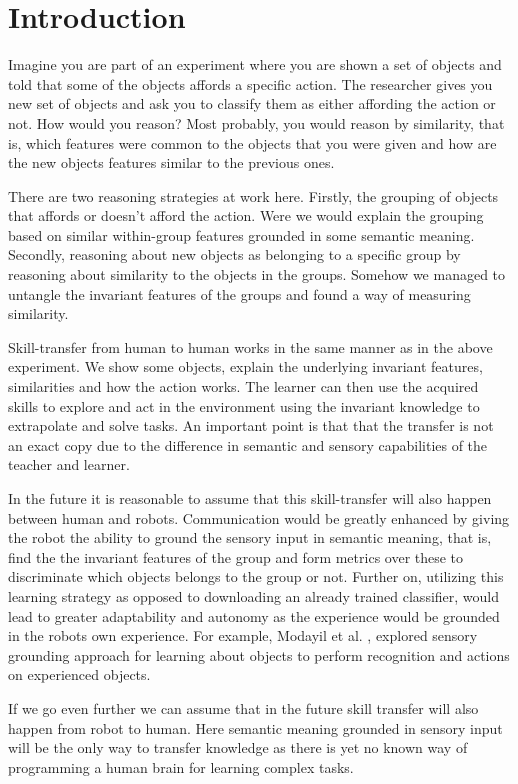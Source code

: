\section{Introduction}\label{introduction}

Imagine you are part of an experiment where you are shown a set of
objects and told that some of the objects affords a specific action. The
researcher gives you new set of objects and ask you to classify them as
either affording the action or not. How would you reason? Most probably,
you would reason by similarity, that is, which features were common to
the objects that you were given and how are the new objects features
similar to the previous ones.

There are two reasoning strategies at work here. Firstly, the grouping
of objects that affords or doesn't afford the action. Were we would
explain the grouping based on similar within-group features grounded in
some semantic meaning. Secondly, reasoning about new objects as
belonging to a specific group by reasoning about similarity to the
objects in the groups. Somehow we managed to untangle the invariant
features of the groups and found a way of measuring similarity.

Skill-transfer from human to human works in the same manner as in the
above experiment. We show some objects, explain the underlying invariant
features, similarities and how the action works. The learner can then
use the acquired skills to explore and act in the environment using the
invariant knowledge to extrapolate and solve tasks. An important point
is that that the transfer is not an exact copy due to the difference in
semantic and sensory capabilities of the teacher and learner.

In the future it is reasonable to assume that this skill-transfer will
also happen between human and robots. Communication would be greatly
enhanced by giving the robot the ability to ground the sensory input in
semantic meaning, that is, find the the invariant features of the group
and form metrics over these to discriminate which objects belongs to the
group or not. Further on, utilizing this learning strategy as opposed to
downloading an already trained classifier, would lead to greater
adaptability and autonomy as the experience would be grounded in the
robots own experience. For example, Modayil et al.
\cite{Modayil:2008it}, explored sensory grounding approach for learning
about objects to perform recognition and actions on experienced objects.

If we go even further we can assume that in the future skill transfer
will also happen from robot to human. Here semantic meaning grounded in
sensory input will be the only way to transfer knowledge as there is yet
no known way of programming a human brain for learning complex tasks.

